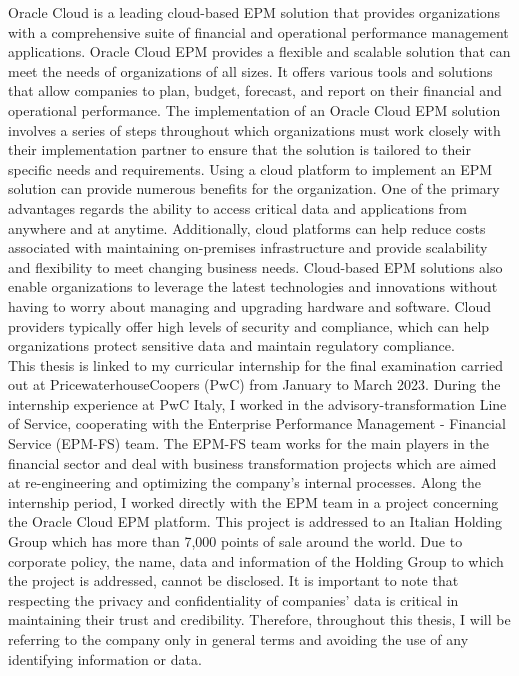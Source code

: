 \documentclass[12pt,a4paper,openright,twoside]{book}
\begin{document}
Oracle Cloud is a leading cloud-based EPM solution that provides organizations with a comprehensive suite of financial and operational performance management applications.
%
Oracle Cloud EPM provides a flexible and scalable solution that can meet the needs of organizations of all sizes.
%
It offers various tools and solutions that allow companies to plan, budget, forecast, and report on their financial and operational performance.
%
The implementation of an Oracle Cloud EPM solution involves a series of steps throughout which organizations must work closely with their implementation partner to ensure that the solution is tailored to their specific needs and requirements.
%
Using a cloud platform to implement an EPM solution can provide numerous benefits for the organization. 
%
One of the primary advantages regards the ability to access critical data and applications from anywhere and at anytime.
%
Additionally, cloud platforms can help reduce costs associated with maintaining on-premises infrastructure and provide scalability and flexibility to meet changing business needs. 
%
Cloud-based EPM solutions also enable organizations to leverage the latest technologies and innovations without having to worry about managing and upgrading hardware and software. 
%
Cloud providers typically offer high levels of security and compliance, which can help organizations protect sensitive data and maintain regulatory compliance. \\

This thesis is linked to my curricular internship for the final examination carried out at PricewaterhouseCoopers (PwC) from January to March 2023.
%
During the internship experience at PwC Italy, I worked in the advisory-transformation Line of Service, cooperating with the Enterprise Performance Management - Financial Service (EPM-FS) team.
%
The EPM-FS team works for the main players in the financial sector and deal with business transformation projects which are aimed at re-engineering and optimizing the company's internal processes.
%
Along the internship period, I worked directly with the EPM team in a project concerning the Oracle Cloud EPM platform.
%
This project is addressed to an Italian Holding Group which has more than 7,000 points of sale around the world. 
%
Due to corporate policy, the name, data and information of the Holding Group to which the project is addressed, cannot be disclosed. 
%
It is important to note that respecting the privacy and confidentiality of companies' data is critical in maintaining their trust and credibility.
%
Therefore, throughout this thesis, I will be referring to the company only in general terms and avoiding the use of any identifying information or data.
\end{document}
